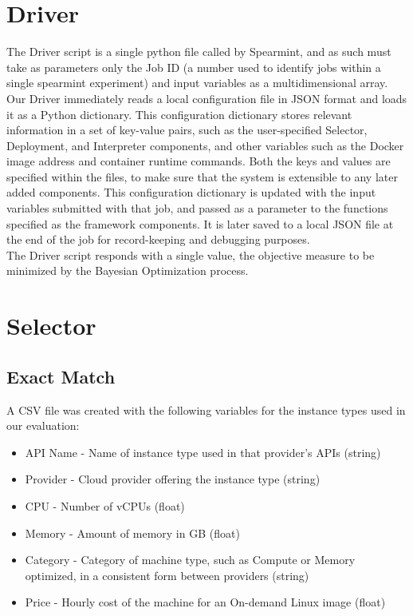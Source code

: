 \documentclass{report}
\begin{document}
\section{Driver}
The Driver script is a single python file called by Spearmint, and as such must take as parameters only the Job ID (a number used to identify jobs within a single spearmint experiment) and input variables as a multidimensional array.\\
Our Driver immediately reads a local configuration file in JSON format and loads it as a Python dictionary. This configuration dictionary stores relevant information in a set of key-value pairs, such as the user-specified Selector, Deployment, and Interpreter components, and other variables such as the Docker image address and container runtime commands. Both the keys and values are specified within the files, to make sure that the system is extensible to any later added components. This configuration dictionary is updated with the input variables submitted with that job, and passed as a parameter to the functions specified as the framework components. It is later saved to a local JSON file at the end of the job for record-keeping and debugging purposes. \\
The Driver script responds with a single value, the objective measure to be minimized by the Bayesian Optimization process.
\section{Selector}
\subsection{Exact Match}
A CSV file was created with the following variables for the instance types used in our evaluation:

\begin{itemize}
\item API Name - Name of instance type used in that provider's APIs (string)
\item Provider - Cloud provider offering the instance type (string)
\item CPU - Number of vCPUs (float)
\item Memory - Amount of memory in GB (float)
\item Category - Category of machine type, such as Compute or Memory optimized, in a consistent form between providers (string) 	
\item Price - Hourly cost of the machine for an On-demand Linux image (float)
\end{itemize}
\end{document}
